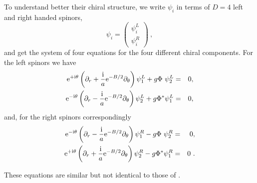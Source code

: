 \documentclass[a4paper,12pt]{article}
\begin{document}
To understand better their chiral structure, we write $\psi_i$ in
terms of $D=4$ left and right handed spinors, 
\begin{equation}
\psi_i = \left(\begin{array}{c}\psi_i^L\\ \psi_i^R
\end{array}\right)~,
\label{4dlr}
\end{equation}
and get the system of four equations for the four different chiral
components. For the left spinors we have
\begin{eqnarray}
{\rm e}^{+{\rm i}\theta} \left(\partial_r+{{\rm i}\over a}
{\rm e}^{-B/2}\partial_\theta\right)\psi_1^L+g\Phi~\psi_2^L&=&0,\\
\nonumber
{\rm e}^{-{\rm i}\theta} \left(\partial_r-{{\rm i}\over a}
{\rm e}^{-B/2}\partial_\theta\right)\psi_2^L+g\Phi^*\psi_1^L&=&0,
\end{eqnarray}
and, for the right spinors correspondingly
\begin{eqnarray}
{\rm e}^{-{\rm i}\theta} \left(\partial_r-{{\rm i}\over a}
{\rm e}^{-B/2}\partial_\theta\right)\psi_1^R-g\Phi~\psi_2^R&=&0,\\
\nonumber
{\rm e}^{+{\rm i}\theta} \left(\partial_r+{{\rm i}\over a}
{\rm e}^{-B/2}\partial_\theta\right)\psi_2^R-g\Phi^*\psi_1^R&=&0~.
\end{eqnarray}

These equations are similar but not identical to those of
\cite{Jackiw:1981ee}.
\end{document}
